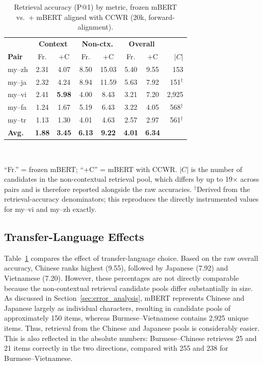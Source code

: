 \documentclass[11pt]{article}
\begin{document}
\begin{table}[t]
\centering
\small
\caption{Retrieval accuracy (P@1) by metric, frozen mBERT vs.\ + mBERT aligned with CCWR (20k, forward-alignment).}
\label{tab:main_results}
\setlength{\tabcolsep}{4pt}
\begin{tabular}{lcc|cc|cc|r}
\toprule
& \multicolumn{2}{c|}{\textbf{Context}} & \multicolumn{2}{c|}{\textbf{Non-ctx.}} & \multicolumn{2}{c|}{\textbf{Overall}} & \\
\textbf{Pair} & Fr. & +C & Fr. & +C & Fr. & +C & $|C|$ \\
\midrule
my--zh & 2.31 & 4.07 & 8.50 & 15.03 & 5.40 & 9.55 & 153 \\
my--ja & 2.32 & 4.24 & 8.94 & 11.59 & 5.63 & 7.92 & 151$^{\dagger}$ \\
my--vi & 2.41 & \textbf{5.98} & 4.00 & 8.43  & 3.21 & 7.20 & 2{,}925 \\
my--fa & 1.24 & 1.67 & 5.19 & 6.43  & 3.22 & 4.05 & 568$^{\dagger}$ \\
my--tr & 1.13 & 1.30 & 4.01 & 4.63  & 2.57 & 2.97 & 561$^{\dagger}$ \\
\midrule
\textbf{Avg.} & \textbf{1.88} & \textbf{3.45} & \textbf{6.13} & \textbf{9.22} & \textbf{4.01} & \textbf{6.34} & \\
\bottomrule
\end{tabular}
\\[2pt]
\raggedright\footnotesize ``Fr.'' = frozen mBERT; ``+C'' = mBERT with CCWR. $|C|$ is the number of candidates in the non-contextual retrieval pool, which differs by up to 19$\times$ across pairs and is therefore reported alongside the raw accuracies. $^{\dagger}$Derived from the retrieval-accuracy denominators; this reproduces the directly instrumented values for my--vi and my--zh exactly.
\end{table}

\subsection{Transfer-Language Effects}
\label{sec:transfer_analysis}

Table~\ref{tab:main_results} compares the effect of transfer-language choice. Based on the raw overall accuracy, Chinese ranks highest (9.55), followed by Japanese (7.92) and Vietnamese (7.20). However, these percentages are not directly comparable because the non-contextual retrieval candidate pools differ substantially in size. As discussed in Section~\ref{sec:error_analysis}, mBERT represents Chinese and Japanese largely as individual characters, resulting in candidate pools of approximately 150 items, whereas Burmese--Vietnamese contains 2,925 unique items. Thus, retrieval from the Chinese and Japanese pools is considerably easier. This is also reflected in the absolute numbers: Burmese--Chinese retrieves 25 and 21 items correctly in the two directions, compared with 255 and 238 for Burmese--Vietnamese.
\end{document}
